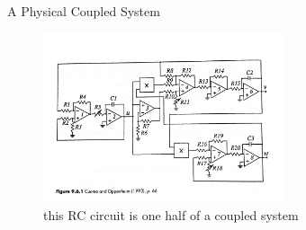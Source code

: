     \begin{frame}{A Physical Coupled System}
        \begin{figure}
            \centering
            \includegraphics[height=5cm]{circuit.png}
            \caption{this RC circuit is one half of a coupled system}
            \label{fig}
        \end{figure}
    \end{frame}
